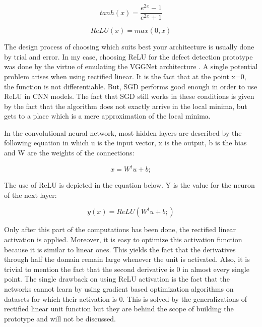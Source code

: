 \documentclass[12pt,a4paper,twoside]{report}
\begin{document}
\begin{equation}
    tanh(x)=\frac{e^{2x}-1}{e^{2x}+1}
\end{equation}

\begin{equation}
    ReLU(x)=max(0,x)
\end{equation}

The design process of choosing which suits best your architecture is usually done by trial and error. In my case, choosing ReLU for the defect detection prototype was done by the virtue of emulating the VGGNet architecture \cite{article-vgg}. A single potential problem arises when using rectified linear. It is the fact that at the point x=0, the function is not differentiable. But, SGD performs good enough in order to use ReLU in CNN models. The fact that SGD still works in these conditions is given by the fact that the algorithm does not exactly arrive in the local minima, but gets to a place which is a mere approximation of the local minima.\par

In the convolutional neural network, most hidden layers are described by the following equation in which u is the input vector, x is the output, b is the bias and W are the weights of the connections:

\begin{equation}
    x=W^{t}u+b;
\end{equation}

The use of ReLU is depicted in the equation below. Y is the value for the neuron of the next layer:

\begin{equation}
    y(x)=ReLU(W^{t}u+b;)
\end{equation}

Only after this part of the computations has been done, the rectified linear activation is applied. Moreover, it is easy to optimize this activation function because it is similar to linear ones. This yields the fact that the derivatives through half the domain remain large whenever the unit is activated. Also, it is trivial to mention the fact that the second derivative is 0 in almost every single point. The single drawback on using ReLU activation is the fact that the networks cannot learn by using gradient based optimization algorithms on datasets for which their activation is 0. This is solved by the generalizations of rectified linear unit function but they are behind the scope of building the prototype and will not be discussed.\par
\end{document}
